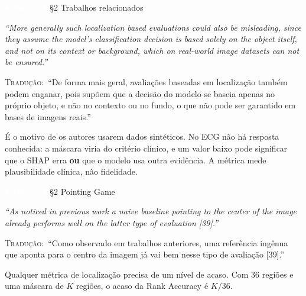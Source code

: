 \documentclass[11pt,a4paper]{article}
\newcommand{\pagechip}[1]{{\setlength{\fboxsep}{1.5pt}\colorbox{cAcc}{\textcolor{white}{\scriptsize\texttt{#1}}}}}
\newenvironment{origquote}{\par\itshape\small}{\par}
\newenvironment{tradquote}{\par\small\textsc{Tradução:}\ }{\par}
\newcommand{\explab}[1]{\par\smallskip{\small\color{cAcc}\textbf{\MakeUppercase{#1}}}\par}
\begin{document}
\begin{citacard}{\pagechip{Arras p. 5} §2 Trabalhos relacionados}
\begin{origquote}“More generally such localization based evaluations could also be misleading, since they assume the model's classification decision is based solely on the object itself, and not on its context or background, which on real-world image datasets can not be ensured.”\end{origquote}
\begin{tradquote}“De forma mais geral, avaliações baseadas em localização também podem enganar, pois supõem que a decisão do modelo se baseia apenas no próprio objeto, e não no contexto ou no fundo, o que não pode ser garantido em bases de imagens reais.”\end{tradquote}
\explab{Explicação}
É o motivo de os autores usarem dados sintéticos. No ECG não há resposta conhecida: a máscara viria do critério clínico, e um valor baixo pode significar que o SHAP erra \textbf{ou} que o modelo usa outra evidência. A métrica mede plausibilidade clínica, não fidelidade.
\end{citacard}

\begin{citacard}{\pagechip{Arras p. 5} §2 Pointing Game}
\begin{origquote}“As noticed in previous work a naive baseline pointing to the center of the image already performs well on the latter type of evaluation [39].”\end{origquote}
\begin{tradquote}“Como observado em trabalhos anteriores, uma referência ingênua que aponta para o centro da imagem já vai bem nesse tipo de avaliação [39].”\end{tradquote}
\explab{Explicação}
Qualquer métrica de localização precisa de um nível de acaso. Com 36 regiões e uma máscara de $K$ regiões, o acaso da Rank Accuracy é $K/36$.
\end{citacard}
\end{document}
